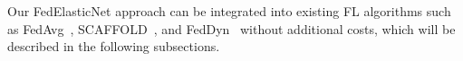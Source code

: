 \documentclass{article} %
\begin{document}

Our FedElasticNet approach can be integrated into existing FL algorithms such as FedAvg~\citep{McMahan2017communication}, SCAFFOLD~\citep{Karimireddy2020scaffold}, and FedDyn~\citep{Acar2021federated} without additional costs, which will be described in the following subsections.   
\end{document}
